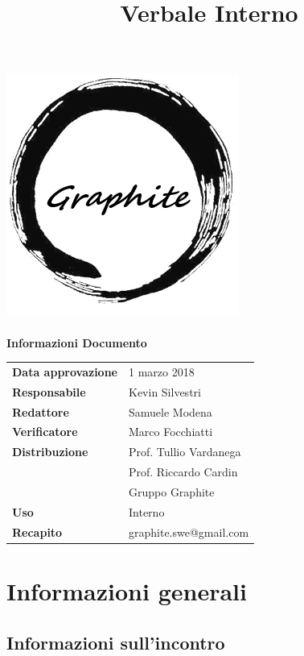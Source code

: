 \documentclass[openany,12pt,a4paper]{article}
\title{Verbale Interno}
\author{}
\begin{document}
	\makeatletter
	\begin{titlepage}
		\setlength{\headsep}{0pt}  
		\begin{center}
			\includegraphics[width=0.5\linewidth]{Logo.png}\\[1em]
			{\huge \bfseries  \@title }\\[10ex]
			\textbf{\Large Informazioni Documento} \\[2em]
			\bgroup
			\def\arraystretch{1.5}
			\begin{tabular}{l|l}
				\textbf{Data approvazione} & 1 marzo 2018 \\
				\textbf{Responsabile} & Kevin Silvestri \\
				\textbf{Redattore} & Samuele Modena \\
				\textbf{Verificatore} & Marco Focchiatti \\
				\textbf{Distribuzione} & Prof. Tullio Vardanega \\
				 & Prof. Riccardo Cardin \\
				 & Gruppo Graphite \\
				\textbf{Uso} & Interno \\
				\textbf{Recapito} & graphite.swe@gmail.com \\
			\end{tabular}
		\egroup
		\end{center}
	\end{titlepage}
	\makeatother

	\thispagestyle{empty}
	\newpage
	
	\tableofcontents
	\newpage
	
	\section{Informazioni generali}
	
	\subsection{Informazioni sull'incontro}
	
\end{document}
